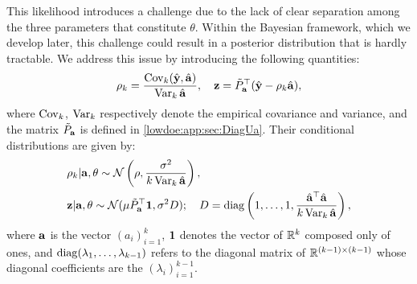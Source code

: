 {
This likelihood introduces a challenge due to the lack of clear separation among the three parameters that constitute $\theta$. Within the Bayesian framework, which we develop later, this challenge could result in a posterior distribution that is hardly tractable. We address this issue by introducing the following quantities:
}
    \begin{equation}
        \rho_k = \frac{\operatorname{Cov}_k(\hat{\mathbf{y}},\hat{\mathbf{a}})}{\operatorname{Var}_k\hat{\mathbf{a}}}, \quad
        \mathbf{z} = \tilde P_{\mathbf{a}}^{\top}(\hat{\mathbf{y}} - \rho_k\hat{\mathbf{a}}) ,
    \end{equation}
where $\operatorname{Cov}_k$, $\operatorname{Var}_k$ respectively denote the empirical covariance and variance, and the matrix $\tilde P_{\mathbf{a}}$ is defined in \cref{lowdoe:app:sec:DiagUa}.
Their conditional distributions are given by:
    \begin{align}
        &  \rho_k|\mbf a,\theta \sim \cN\left( \rho,\frac{\sigma^2}{k\Var_k\hatmbf a} \right), \\
        &   \mbf z | \mbf a, \theta \sim  \cN(\mu\tilde P_{\mbf a}^{\top}\mbf 1,\sigma^2D);\quad D=\diag\left(1,\dots,1,\frac{\hatmbf a^{\top}\hatmbf a}{k\Var_k\hatmbf a}\right), %
    \end{align}
where $\mathbf{a}$ is the vector $(a_i)_{i=1}^k$, $\mathbf{1}$ denotes the vector of $\mathbb{R}^k$ composed only of ones, and $\operatorname{diag}(\lambda_1,\dots,\lambda_{k-1}) $ refers to the diagonal matrix of $\mathbb{R}^{(k-1)\times(k-1)}$ whose diagonal coefficients are the $(\lambda_i)_{i=1}^{k-1}$. 

